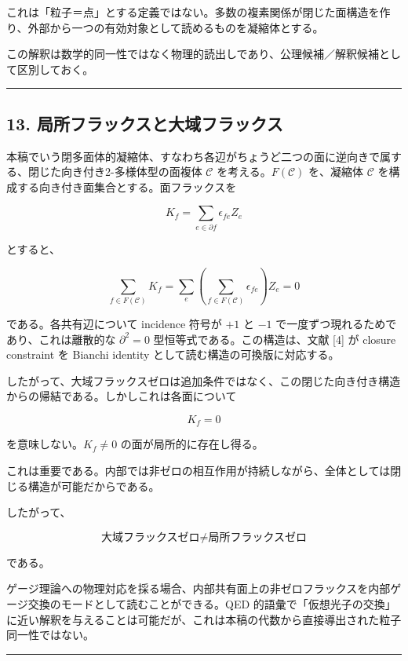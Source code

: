 \documentclass[
  a4paper,
]{ltjsarticle}
\begin{document}
これは「粒子＝点」とする定義ではない。多数の複素関係が閉じた面構造を作り、外部から一つの有効対象として読めるものを凝縮体とする。

この解釈は数学的同一性ではなく物理的読出しであり、公理候補／解釈候補として区別しておく。

\begin{center}\rule{0.5\linewidth}{0.5pt}\end{center}

\subsection{13.
局所フラックスと大域フラックス}\label{ux5c40ux6240ux30d5ux30e9ux30c3ux30afux30b9ux3068ux5927ux57dfux30d5ux30e9ux30c3ux30afux30b9}

本稿でいう閉多面体的凝縮体、すなわち各辺がちょうど二つの面に逆向きで属する、閉じた向き付き2-多様体型の面複体
\(\mathcal C\) を考える。\(F(\mathcal C)\) を、凝縮体 \(\mathcal C\)
を構成する向き付き面集合とする。面フラックスを

\[
K_f=\sum_{e\in\partial f}\epsilon_{fe}Z_e
\]

とすると、

\[
\sum_{f\in F(\mathcal C)}K_f=\sum_{e}\left(\sum_{f\in F(\mathcal C)}\epsilon_{fe}\right)Z_e=0
\]

である。各共有辺について incidence 符号が \(+1\) と \(-1\)
で一度ずつ現れるためであり、これは離散的な \(\partial^2=0\)
型恒等式である。この構造は、文献 {[}4{]} が closure constraint を
Bianchi identity として読む構造の可換版に対応する。

したがって、大域フラックスゼロは追加条件ではなく、この閉じた向き付き構造からの帰結である。しかしこれは各面について

\[
K_f=0
\]

を意味しない。\(K_f\neq0\) の面が局所的に存在し得る。

これは重要である。内部では非ゼロの相互作用が持続しながら、全体としては閉じる構造が可能だからである。

したがって、

\[
\boxed{\text{大域フラックスゼロ}\neq\text{局所フラックスゼロ}}
\]

である。

ゲージ理論への物理対応を採る場合、内部共有面上の非ゼロフラックスを内部ゲージ交換のモードとして読むことができる。QED
的語彙で「仮想光子の交換」に近い解釈を与えることは可能だが、これは本稿の代数から直接導出された粒子同一性ではない。

\begin{center}\rule{0.5\linewidth}{0.5pt}\end{center}
\end{document}
